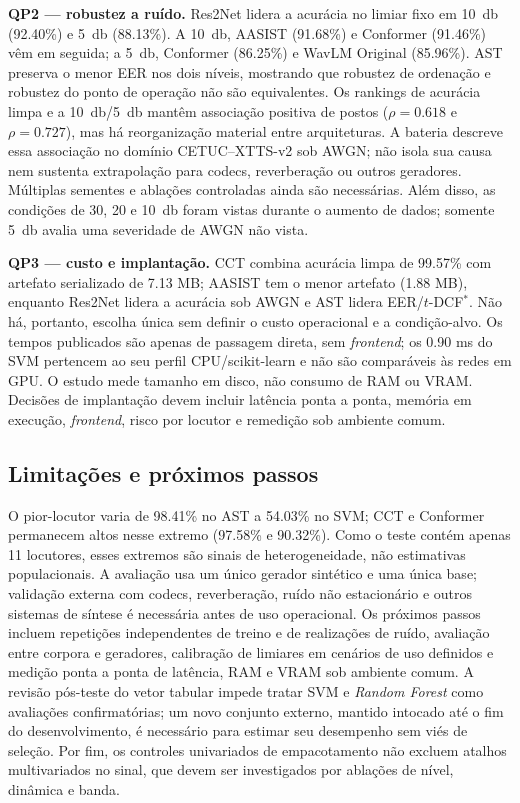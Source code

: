 \documentclass[12pt,a4paper]{article}
\begin{document}
\textbf{QP2 --- robustez a ruído.} Res2Net lidera a acurácia no limiar fixo em
\SI{10}{\decibel} (\num{92,40}\%) e \SI{5}{\decibel} (\num{88,13}\%). A
\SI{10}{\decibel}, AASIST (\num{91,68}\%) e Conformer (\num{91,46}\%) vêm em
seguida; a \SI{5}{\decibel}, Conformer (\num{86,25}\%) e WavLM Original
(\num{85,96}\%). AST preserva o menor EER nos dois níveis, mostrando que
robustez de ordenação e robustez do ponto de operação não são equivalentes.
Os rankings de acurácia limpa e a \SI{10}{\decibel}/\SI{5}{\decibel} mantêm
associação positiva de postos ($\rho=\num{0,618}$ e
$\rho=\num{0,727}$), mas
há reorganização material entre arquiteturas. A bateria descreve essa
associação no domínio CETUC--XTTS-v2 sob AWGN; não isola sua causa nem sustenta
extrapolação para codecs, reverberação ou outros geradores. Múltiplas sementes
e ablações controladas ainda são necessárias. Além disso, as condições de 30,
20 e \SI{10}{\decibel} foram vistas durante o aumento de dados; somente
\SI{5}{\decibel} avalia uma severidade de AWGN não vista.

\textbf{QP3 --- custo e implantação.} CCT combina acurácia limpa de
\num{99,57}\% com artefato serializado de \num{7,13} MB; AASIST tem o menor
artefato (\num{1,88} MB), enquanto Res2Net lidera a acurácia sob AWGN e AST
lidera EER/$t$-DCF$^\ast$. Não há, portanto, escolha única sem definir o custo
operacional e a condição-alvo. Os tempos publicados são apenas de
passagem direta, sem \textit{frontend}; os \num{0,90} ms do SVM pertencem ao
seu perfil CPU/scikit-learn e não são comparáveis às redes em GPU. O estudo
mede tamanho em disco, não consumo de RAM ou VRAM. Decisões de implantação
devem incluir latência ponta a ponta, memória em execução, \textit{frontend},
risco por locutor e remedição sob ambiente comum.

\subsection*{Limitações e próximos passos}
\label{sec:limitacoes}
\label{sec:trabalhos_futuros}

O pior-locutor varia de \num{98,41}\% no AST a \num{54,03}\% no SVM; CCT e
Conformer permanecem altos nesse extremo (\num{97,58}\% e \num{90,32}\%).
Como o teste contém apenas
\num{11} locutores, esses extremos são sinais de heterogeneidade, não estimativas
populacionais. A avaliação usa um único gerador sintético e uma única base;
validação externa com codecs, reverberação, ruído não estacionário e outros
sistemas de síntese é necessária antes de uso operacional. Os próximos passos
incluem repetições independentes de treino e de realizações de ruído, avaliação entre corpora e geradores,
calibração de limiares em cenários de uso definidos e medição ponta a ponta de
latência, RAM e VRAM sob ambiente comum. A revisão pós-teste do vetor tabular
impede tratar SVM e \textit{Random Forest} como avaliações confirmatórias; um
novo conjunto externo, mantido intocado até o fim do desenvolvimento, é
necessário para estimar seu desempenho sem viés de seleção. Por fim, os
controles univariados de empacotamento não excluem atalhos multivariados no
sinal, que devem ser investigados por ablações de nível, dinâmica e banda.
\end{document}
